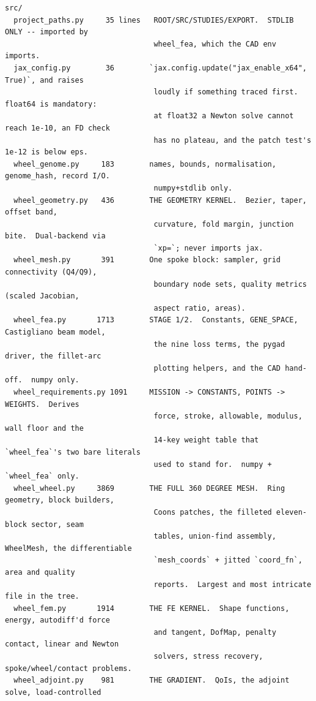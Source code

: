 \documentclass[11pt,a4paper]{article}
\begin{document}
\begin{lstlisting}
src/
  project_paths.py     35 lines   ROOT/SRC/STUDIES/EXPORT.  STDLIB ONLY -- imported by
                                  wheel_fea, which the CAD env imports.
  jax_config.py        36        `jax.config.update("jax_enable_x64", True)`, and raises
                                  loudly if something traced first.  float64 is mandatory:
                                  at float32 a Newton solve cannot reach 1e-10, an FD check
                                  has no plateau, and the patch test's 1e-12 is below eps.
  wheel_genome.py     183        names, bounds, normalisation, genome_hash, record I/O.
                                  numpy+stdlib only.
  wheel_geometry.py   436        THE GEOMETRY KERNEL.  Bezier, taper, offset band,
                                  curvature, fold margin, junction bite.  Dual-backend via
                                  `xp=`; never imports jax.
  wheel_mesh.py       391        One spoke block: sampler, grid connectivity (Q4/Q9),
                                  boundary node sets, quality metrics (scaled Jacobian,
                                  aspect ratio, areas).
  wheel_fea.py       1713        STAGE 1/2.  Constants, GENE_SPACE, Castigliano beam model,
                                  the nine loss terms, the pygad driver, the fillet-arc
                                  plotting helpers, and the CAD hand-off.  numpy only.
  wheel_requirements.py 1091     MISSION -> CONSTANTS, POINTS -> WEIGHTS.  Derives
                                  force, stroke, allowable, modulus, wall floor and the
                                  14-key weight table that `wheel_fea`'s two bare literals
                                  used to stand for.  numpy + `wheel_fea` only.
  wheel_wheel.py     3869        THE FULL 360 DEGREE MESH.  Ring geometry, block builders,
                                  Coons patches, the filleted eleven-block sector, seam
                                  tables, union-find assembly, WheelMesh, the differentiable
                                  `mesh_coords` + jitted `coord_fn`, area and quality
                                  reports.  Largest and most intricate file in the tree.
  wheel_fem.py       1914        THE FE KERNEL.  Shape functions, energy, autodiff'd force
                                  and tangent, DofMap, penalty contact, linear and Newton
                                  solvers, stress recovery, spoke/wheel/contact problems.
  wheel_adjoint.py    981        THE GRADIENT.  QoIs, the adjoint solve, load-controlled

\end{lstlisting}
\end{document}
